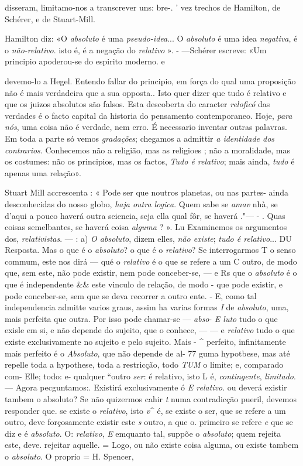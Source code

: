 disseram, limitamo-nos a transcrever uns: bre-. ' vez trechos de Hamilton, de Schérer, e de Stuart-Mill.\par Hamilton diz: «O \emph{absoluto} é uma \emph{pseudo-idea}... O \emph{absoluto} é uma idea \emph{negativa}, é o \emph{não-relativo}. isto é, é a negação do \emph{relativo} ». - ---Schérer escreve: «Um principio apoderou-se do espirito moderno. e\par devemo-lo a Hegel. Entendo fallar do principio, em força do qual uma proposição não é mais verdadeira que a sua opposta.. Isto quer dizer que tudo é relativo e que os juizos absolutos são falsos. Esta descoberta do caracter \emph{reloficó} das verdades é o facto capital da historia do pensamento contemporaneo. Hoje, \emph{para nós}, uma coisa não é verdade, nem erro. É necessario inventar outras palavras. Em toda a parte só vemos \emph{gradações}; chegamos a admittir \emph{a identidade dos contrarios}. Conhecemos não a religião, mas as religioes ; não a moralidade, mas os costumes: não os principios, mas os factos, \emph{Tudo é relativo}; mais ainda, \emph{tudo} é apenas uma relação».\par Stuart Mill accrescenta : « Pode ser que noutros planetas, ou nas partes- ainda desconhecidas do nosso globo, \emph{haja outra logica}. Quem sabe se \emph{amav} nhà, se d'aqui a pouco haverá outra seiencia, seja ella qual fôr, se haverá ."--- - . Quas coisas semelbantes, se haverá coisa \emph{alguma} ? ». Lu Examinemos os argumentos dos, \emph{relativistas}. --- : a) \emph{O absoluto}, dizem elles, \emph{não existe}; \emph{tudo é relativo}... DU Resposta. Mas o que é o \emph{absoluto}? o que é o \emph{relativo}? Se interrogarmos T o senso commum, este nos dirá --- qué o \emph{relativo} é o que se refere a um C outro, de modo que, sem este, não pode existir, nem pode conceber-se, --- e Rs que o \emph{absoluto} é o que é independente \&\& este vinculo de relação, de modo - que pode existir, e pode conceber-se, sem que se deva recorrer a outro ente. - E, como tal independencia admitte varios graus, assim ha varias formas \emph{I} de \emph{absoluto}, uma, mais perfeita que outra. Por isso pode chamar-se --- \emph{abso}- \emph{E luto} tudo o que exisle em si, e não depende do sujeito, que o conhece, --- --- e \emph{relativo} tudo o que existe exclusivamente no sujeito e pelo sujeito. Mais - \textasciicircum{} perfeito, infinitamente mais perfeito é o \emph{Absoluto}, que não depende de al- 77 guma hypotbese, mas até repelle toda a hypothese, toda a restricção, todo \emph{TUM} o limite; e, comparado com- Elle; todo: e- qualquer “outro \emph{ser}: é relativo, isto L é, \emph{contingente}, \emph{limitado}. --- Agora pecguntamos:. Existirá exclusivamente ó \emph{E relativo}. ou deverá existir tambem o absoluto? Se não quizermos cahir \emph{t} numa contradicção pueril, devemos responder que. se existe o \emph{relativo}, isto \emph{v}\textasciicircum{} é, se existe o ser, que se refere a um outro, deve forçosamente existir este \emph{s} outro, a que o. primeiro se refere \emph{e} que se diz e é \emph{absoluto}. O: \emph{relativo}, \emph{E} emquanto tal, suppõe o \emph{absoluto}; quem rejeita este, deve. rejeitar aquelle. = Logo, ou não existe coisa alguma, ou existe tambem o \emph{absoluto}. O proprio = H. Spencer, 